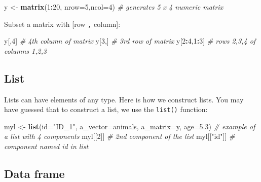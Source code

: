 \documentclass[]{book}
\newenvironment{Shaded}{\begin{snugshade}}{\end{snugshade}}
\newcommand{\KeywordTok}[1]{\textcolor[rgb]{0.13,0.29,0.53}{\textbf{#1}}}
\newcommand{\DataTypeTok}[1]{\textcolor[rgb]{0.13,0.29,0.53}{#1}}
\newcommand{\DecValTok}[1]{\textcolor[rgb]{0.00,0.00,0.81}{#1}}
\newcommand{\FloatTok}[1]{\textcolor[rgb]{0.00,0.00,0.81}{#1}}
\newcommand{\StringTok}[1]{\textcolor[rgb]{0.31,0.60,0.02}{#1}}
\newcommand{\CommentTok}[1]{\textcolor[rgb]{0.56,0.35,0.01}{\textit{#1}}}
\newcommand{\OperatorTok}[1]{\textcolor[rgb]{0.81,0.36,0.00}{\textbf{#1}}}
\newcommand{\NormalTok}[1]{#1}
\begin{document}
\begin{Shaded}
\begin{Highlighting}[]
\NormalTok{y <-}\StringTok{ }\KeywordTok{matrix}\NormalTok{(}\DecValTok{1}\OperatorTok{:}\DecValTok{20}\NormalTok{, }\DataTypeTok{nrow=}\DecValTok{5}\NormalTok{,}\DataTypeTok{ncol=}\DecValTok{4}\NormalTok{) }\CommentTok{# generates 5 x 4 numeric matrix}
\end{Highlighting}
\end{Shaded}

Subset a matrix with {[}row \texttt{,} column{]}:

\begin{Shaded}
\begin{Highlighting}[]
\NormalTok{y[,}\DecValTok{4}\NormalTok{]       }\CommentTok{# 4th column of matrix}
\NormalTok{y[}\DecValTok{3}\NormalTok{,]       }\CommentTok{# 3rd row of matrix}
\NormalTok{y[}\DecValTok{2}\OperatorTok{:}\DecValTok{4}\NormalTok{,}\DecValTok{1}\OperatorTok{:}\DecValTok{3}\NormalTok{]  }\CommentTok{# rows 2,3,4 of columns 1,2,3}
\end{Highlighting}
\end{Shaded}

\subsection{List}\label{list}

Lists can have elements of any type. Here is how we construct lists. You
may have guessed that to construct a list, we use the \texttt{list()}
function:

\begin{Shaded}
\begin{Highlighting}[]
\NormalTok{myl <-}\StringTok{ }\KeywordTok{list}\NormalTok{(}\DataTypeTok{id=}\StringTok{"ID_1"}\NormalTok{, }\DataTypeTok{a_vector=}\NormalTok{animals, }\DataTypeTok{a_matrix=}\NormalTok{y, }\DataTypeTok{age=}\FloatTok{5.3}\NormalTok{) }\CommentTok{# example of a list with 4 components}
\NormalTok{myl[[}\DecValTok{2}\NormalTok{]] }\CommentTok{# 2nd component of the list}
\NormalTok{myl[[}\StringTok{"id"}\NormalTok{]] }\CommentTok{# component named id in list}
\end{Highlighting}
\end{Shaded}

\subsection{Data frame}\label{data-frame}
\end{document}
